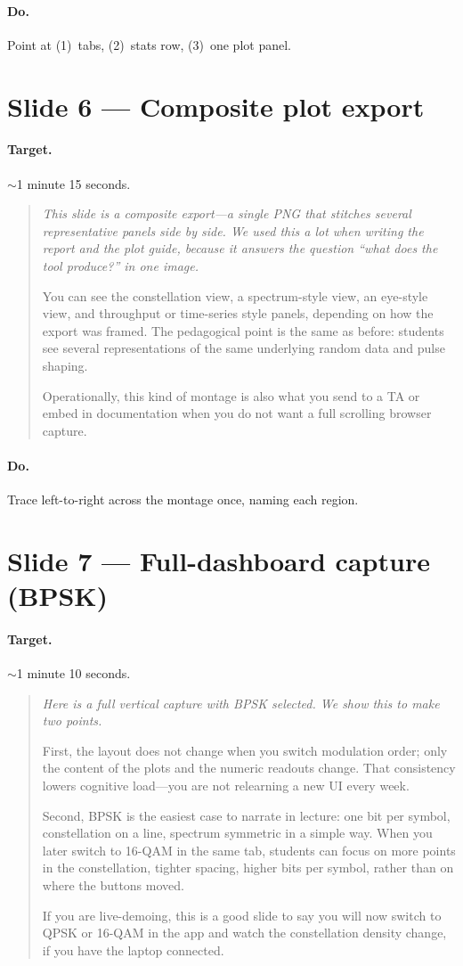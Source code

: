 \documentclass[11pt,a4paper]{article}
\newcommand{\speak}[1]{%
  \begin{quote}\itshape #1\end{quote}%
}
\newcommand{\doitem}[1]{\paragraph{Do.} #1\par\vspace{0.6em}}
\begin{document}
\doitem{Point at (1)~tabs, (2)~stats row, (3)~one plot panel.}

\section{Slide 6 --- Composite plot export}

\paragraph{Target.} $\sim$1 minute 15 seconds.

\speak{%
This slide is a composite export---a single PNG that stitches several representative panels side by side. We used this a lot when writing the report and the plot guide, because it answers the question ``what does the tool produce?'' in one image.

You can see the constellation view, a spectrum-style view, an eye-style view, and throughput or time-series style panels, depending on how the export was framed. The pedagogical point is the same as before: students see several representations of the same underlying random data and pulse shaping.

Operationally, this kind of montage is also what you send to a TA or embed in documentation when you do not want a full scrolling browser capture.%
}

\doitem{Trace left-to-right across the montage once, naming each region.}

\section{Slide 7 --- Full-dashboard capture (BPSK)}

\paragraph{Target.} $\sim$1 minute 10 seconds.

\speak{%
Here is a full vertical capture with BPSK selected. We show this to make two points.

First, the layout does not change when you switch modulation order; only the content of the plots and the numeric readouts change. That consistency lowers cognitive load---you are not relearning a new UI every week.

Second, BPSK is the easiest case to narrate in lecture: one bit per symbol, constellation on a line, spectrum symmetric in a simple way. When you later switch to 16-QAM in the same tab, students can focus on more points in the constellation, tighter spacing, higher bits per symbol, rather than on where the buttons moved.

If you are live-demoing, this is a good slide to say you will now switch to QPSK or 16-QAM in the app and watch the constellation density change, if you have the laptop connected.%
}
\end{document}
